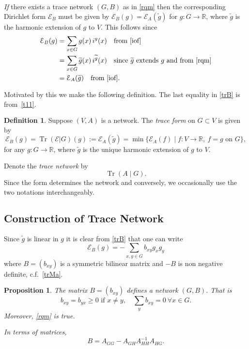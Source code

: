 \documentclass[a4paper]{amsart}
\theoremstyle{plain}
\newtheorem{proposition}[theorem]{Proposition}
\theoremstyle{definition}
\newtheorem{definition}[theorem]{Definition}%
\theoremstyle{remark}
\DeclareMathOperator{\Tr}{Tr}
\begin{document}
\emph{If} there exists a trace network $ (G,B) $ as in \eqref{rqm} then 
 the corresponding Dirichlet form $ \mathcal{E}_B$ must be given by
$   \mathcal{E}_B(g) =  \mathcal{E}_A(\widetilde{g})$ for $  g:G \to \mathbb{R} $,  
where $ \widetilde{g} $ is the harmonic extension of $ g $ to $ V $.   This follows since
\begin{align*}
\mathcal{E}_B(g) &= \sum_{x\in G} g(x) \, i^g(x) \quad \text{from \eqref{iof}}\\
    &= \sum_{x\in G}\widetilde{g}(x) \, i^{\widetilde{g}}(x) \quad 
                \text{since $\widetilde{g}$ extends $ g $ and from \eqref{rqm}} \\
  &=   \mathcal{E}_A(\widetilde{g}) \quad \text{from \eqref{iof}}.
   \end{align*} 

Motivated by this we make the following definition.  The last equality in \eqref{trB} is from~\eqref{t11}.
\begin{definition} Suppose   $ (V,A) $ is a network. The \emph{trace form} on $ G \subset V  $ is given by
\begin{equation} \label{trB}
  \boxed{  \mathcal{E}_B(g) = \Tr(\mathcal{E} | G ) (g) := \mathcal{E}_A(\widetilde{g}) = 
  \min \{  \mathcal{E}_A(f) \mid f:V\to \mathbb{R},\ f=g \text{ on } G\},}
\end{equation} 
for any $ g : G \to \mathbb{R} $, where $ \widetilde{g} $ is the unique harmonic extension of $ g $ to $V $.  

Denote the \emph{trace network} by
\begin{equation} \label{} 
 \boxed{  \Tr (A\mid G)  .}
\end{equation} 
Since the form determines the network and conversely, we  occasionally use the two notations interchangeably.
\end{definition}


\subsection{Construction of Trace Network}\label{secctn}
Since $ \widetilde{g} $ is linear in $ g $  it is clear from \eqref{trB} that one can write
\[
 \mathcal{E}_B (g) = -\sum_{x,y\in G} b_{xy}g_x g_y  
\]
where  $  B =(b_{xy}) $ is a  symmetric bilinear matrix and  $ -B $ is non negative definite, c.f.~\eqref{trMa}. 

\begin{proposition}
  The matrix $ B =(b_{xy}) $ defines a network $( G,B) $.   That is
\[
b_{xy} = b_{yx}\geq 0 \text{ if } x \neq y,  \quad \sum_y{b_{xy}} = 0 \ \forall x \in G.
\]
Moreover, \eqref{rqm} is true.

In terms of matrices, 
\begin{equation} \label{mtr} 
\boxed{ B = A_{GG} - A_{GH} A_{HH}^{-1} A_{HG}.}
\end{equation} 
\end{proposition}
\end{document}

